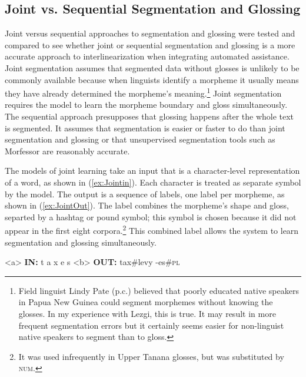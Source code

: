 

\subsection{Joint vs. Sequential Segmentation and Glossing}
\label{sec:sgjoint}

Joint versus sequential approaches to segmentation and glossing were tested and compared to see whether joint or sequential segmentation and glossing is a more accurate approach to interlinearization when integrating automated assistance. Joint segmentation assumes that segmented data without glosses is unlikely to be commonly available because when linguists identify a morpheme it usually means they have already determined the morpheme's meaning.\footnote{Field linguist Lindy Pate (p.c.) believed that poorly educated native speakers in Papua New Guinea could segment morphemes without knowing the glosses. In my experience with Lezgi, this is true. It may result in more frequent segmentation errors but it certainly seems easier for non-linguist native speakers to segment than to gloss.} 
Joint segmentation requires the model to learn the morpheme boundary and gloss simultaneously. The sequential approach presupposes that glossing happens after the whole text is segmented. It assumes that segmentation is easier or faster to do than joint segmentation and glossing or that unsupervised segmentation tools such as Morfessor \citep{smit-etal-2014-morfessor} are reasonably accurate.

The models of joint learning take an input that is a character-level representation of a word, as shown in (\ref{ex:Jointin}). Each character is treated as separate symbol by the model. The output is a sequence of labels, one label per morpheme, as shown in (\ref{ex:JointOut}). The label combines the morpheme's shape and gloss, separted by a hashtag or pound symbol; this symbol is chosen because it did not appear in the first eight corpora.\footnote{It was used infrequently in Upper Tanana glosses, but was substituted by \textsc{num}.} This combined label allows the system to learn segmentation and glossing simultaneously. 

\pex   
\label{ex:JointInOut}
\a<a> \textbf{IN:} \hspace{6 mm} t \hspace{2 mm} a \hspace{2 mm} x \hspace{2 mm} e \hspace{2 mm} s 
\label{ex:Jointin}
\a<b> \textbf{OUT:} \hspace{2 mm} tax\#levy \hspace{3 mm} -es\#\textsc{pl} 
\label{ex:JointOut}
\xe

